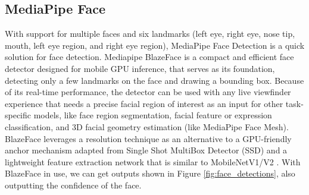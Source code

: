 \subsection*{MediaPipe Face}
With support for multiple faces and six landmarks (left eye, right eye, nose tip, mouth, left eye region, and right eye region), MediaPipe Face Detection is a quick solution for face detection. Mediapipe BlazeFace \cite{bazarevsky2019blazeface} is a compact and efficient face detector designed for mobile GPU inference, that serves as its foundation, detecting only a few landmarks on the face and drawing a bounding box. Because of its real-time performance, the detector can be used with any live viewfinder experience that needs a precise facial region of interest as an input for other task-specific models, like face region segmentation, facial feature or expression classification, and 3D facial geometry estimation (like MediaPipe Face Mesh). BlazeFace leverages a resolution technique as an alternative to a GPU-friendly anchor mechanism adapted from Single Shot MultiBox Detector (SSD) \cite{Liu_2016} and a lightweight feature extraction network that is similar to MobileNetV1/V2 \cite{howard2017mobilenets}. With BlazeFace in use, we can get outputs shown in Figure \ref{fig:face_detections}, also outputting the confidence of the face.


